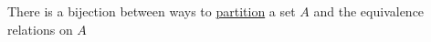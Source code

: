 
There is a bijection between ways to \href{doc/1 math/Seven Sketches in Compositionality/1 Generative Effects/2 What is order/Partition}{partition} a set $A$ and the equivalence relations on $A$
